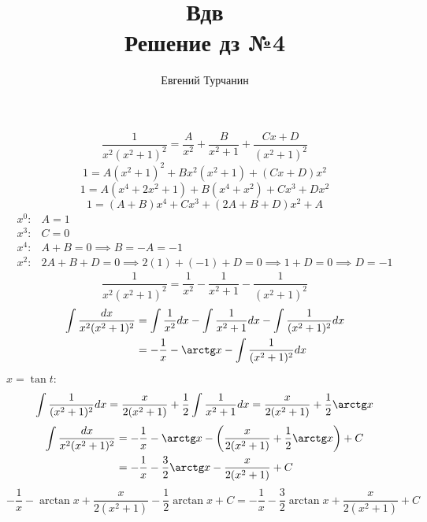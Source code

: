 \documentclass{report}
\title{\Huge{Вдв}\\ Решение дз №4}
\author{\huge{Евгений Турчанин}}
\date{}
\begin{document}
\maketitle

\sol
{}
\[
\dfrac{1}{x^2(x^2+1)^2} = \dfrac{A}{x^2} + \dfrac{B}{x^2+1} + \dfrac{Cx+D}{(x^2+1)^2}
\]
\[
1 = A(x^2+1)^2 + Bx^2(x^2+1) + (Cx+D)x^2
\]
\[
1 = A(x^4+2x^2+1) + B(x^4+x^2) + Cx^3+Dx^2
\]
\[
1 = (A+B)x^4 + Cx^3 + (2A+B+D)x^2 + A
\]
\begin{align*}
x^0:& A = 1 \\
x^3:& C = 0 \\
x^4:& A+B = 0 \implies B = -A = -1 \\
x^2:& 2A+B+D = 0 \implies 2(1) + (-1) + D = 0 \implies 1+D = 0 \implies D = -1
\end{align*}
\[
\dfrac{1}{x^2(x^2+1)^2} = \dfrac{1}{x^2} - \dfrac{1}{x^2+1} - \dfrac{1}{(x^2+1)^2}
\]
\begin{align*}
\int \dfrac{dx}{x^2(x^2+1)^2} &= \int \dfrac{1}{x^2} dx - \int \dfrac{1}{x^2+1} dx - \int \dfrac{1}{(x^2+1)^2} dx \\
&= -\dfrac{1}{x} - \arctg x - \int \dfrac{1}{(x^2+1)^2} dx
\end{align*}
 $x = \tan t$:
\[
\int \dfrac{1}{(x^2+1)^2} dx = \dfrac{x}{2(x^2+1)} + \dfrac{1}{2}\int \dfrac{1}{x^2+1} dx = \dfrac{x}{2(x^2+1)} + \dfrac{1}{2}\arctg x
\]
\begin{align*}
\int \dfrac{dx}{x^2(x^2+1)^2} &= -\dfrac{1}{x} - \arctg x - \left( \dfrac{x}{2(x^2+1)} + \dfrac{1}{2}\arctg x \right) + C \\
&= -\dfrac{1}{x} - \dfrac{3}{2}\arctg x - \dfrac{x}{2(x^2+1)} + C
\end{align*}
\[
-\dfrac{1}{x} - \arctan x + \dfrac{x}{2(x^2+1)} - \dfrac{1}{2}\arctan x + C = -\dfrac{1}{x} - \dfrac{3}{2}\arctan x + \dfrac{x}{2(x^2+1)} + C
\]
\end{document}
